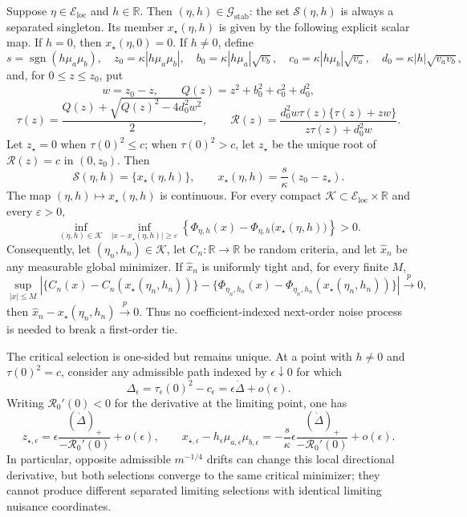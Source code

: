 Suppose \(\eta\in\mathcal E_{\mathrm{loc}}\) and \(h\in\mathbb R\).  Then \((\eta,h)\in\mathcal G_{\mathrm{stab}}\): the set \(\mathcal S(\eta,h)\) is always a separated singleton.  Its member \(x_\star(\eta,h)\) is given by the following explicit scalar map.  If \(h=0\), then \(x_\star(\eta,0)=0\).  If \(h\neq0\), define
\[
 s=\operatorname{sgn}(h\mu_a\mu_b),\quad
 z_0=\kappa|h\mu_a\mu_b|,\quad
 b_0=\kappa|h\mu_a|\sqrt{v_b},\quad
 c_0=\kappa|h\mu_b|\sqrt{v_a},\quad
 d_0=\kappa|h|\sqrt{v_av_b},
\]
and, for \(0\leq z\leq z_0\), put
\[
 w=z_0-z,\qquad Q(z)=z^2+b_0^2+c_0^2+d_0^2,
\]
\[
 \tau(z)=\frac{Q(z)+\sqrt{Q(z)^2-4d_0^2w^2}}{2},\qquad
 \mathcal R(z)=\frac{d_0^2w\tau(z)\{\tau(z)+zw\}}
 {z\tau(z)+d_0^2w}.
\]
Let \(z_\star=0\) when \(\tau(0)^2\leq c\); when \(\tau(0)^2>c\), let \(z_\star\) be the unique root of \(\mathcal R(z)=c\) in \((0,z_0)\).  Then
\[
 \mathcal S(\eta,h)=\{x_\star(\eta,h)\},\qquad
 x_\star(\eta,h)=\frac{s}{\kappa}(z_0-z_\star).
\]
The map \((\eta,h)\mapsto x_\star(\eta,h)\) is continuous.  For every compact \(\mathcal K\subset\mathcal E_{\mathrm{loc}}\times\mathbb R\) and every \(\varepsilon>0\),
\[
 \inf_{(\eta,h)\in\mathcal K}\ \inf_{|x-x_\star(\eta,h)|\geq\varepsilon}
 \left\{\Phi_{\eta,h}(x)-\Phi_{\eta,h}\bigl(x_\star(\eta,h)\bigr)\right\}>0. \tag{8}
\]
Consequently, let \((\eta_n,h_n)\in\mathcal K\), let \(C_n:\mathbb R\to\mathbb R\) be random criteria, and let \(\widehat x_n\) be any measurable global minimizer.  If \(\widehat x_n\) is uniformly tight and, for every finite \(M\),
\[
 \sup_{|x|\leq M}\left|
 \{C_n(x)-C_n(x_\star(\eta_n,h_n))\}
 -\{\Phi_{\eta_n,h_n}(x)-\Phi_{\eta_n,h_n}(x_\star(\eta_n,h_n))\}
 \right|\xrightarrow{p}0,
\]
then \(\widehat x_n-x_\star(\eta_n,h_n)\xrightarrow{p}0\).  Thus no coefficient-indexed next-order noise process is needed to break a first-order tie.

The critical selection is one-sided but remains unique.  At a point with \(h\neq0\) and \(\tau(0)^2=c\), consider any admissible path indexed by \(\epsilon\downarrow0\) for which
\[
 \Delta_\epsilon=\tau_\epsilon(0)^2-c_\epsilon
 =\epsilon\dot\Delta+o(\epsilon).
\]
Writing \(\mathcal R_0'(0)<0\) for the derivative at the limiting point, one has
\[
 z_{\star,\epsilon}
 =\epsilon\frac{(\dot\Delta)_+}{-\mathcal R_0'(0)}+o(\epsilon),
 \qquad
 x_{\star,\epsilon}-h_\epsilon\mu_{a,\epsilon}\mu_{b,\epsilon}
 =-\frac{s}{\kappa}\epsilon
 \frac{(\dot\Delta)_+}{-\mathcal R_0'(0)}+o(\epsilon).
\]
In particular, opposite admissible \(m^{-1/4}\) drifts can change this local directional derivative, but both selections converge to the same critical minimizer; they cannot produce different separated limiting selections with identical limiting nuisance coordinates.

